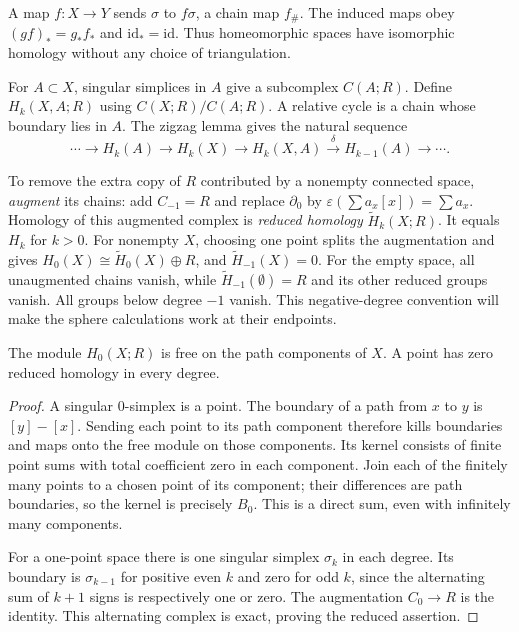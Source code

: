 A map $f:X\to Y$ sends $\sigma$ to $f\sigma$, a chain map $f_\#$. The induced maps obey $(gf)_*=g_*f_*$ and $\mathrm{id}_*=\mathrm{id}$. Thus homeomorphic spaces have isomorphic homology without any choice of triangulation.

For $A\subset X$, singular simplices in $A$ give a subcomplex $C(A;R)$. Define $H_k(X,A;R)$ using $C(X;R)/C(A;R)$. A relative cycle is a chain whose boundary lies in $A$. The zigzag lemma gives the natural sequence
\[
\cdots\to H_k(A)\to H_k(X)\to H_k(X,A)\xrightarrow{\delta}H_{k-1}(A)\to\cdots.
\]

To remove the extra copy of $R$ contributed by a nonempty connected space, \emph{augment} its chains: add $C_{-1}=R$ and replace $\partial_0$ by $\varepsilon(\sum a_x[x])=\sum a_x$. Homology of this augmented complex is \emph{reduced homology} $\tilde H_k(X;R)$. It equals $H_k$ for $k>0$. For nonempty $X$, choosing one point splits the augmentation and gives $H_0(X)\cong\tilde H_0(X)\oplus R$, and $\tilde H_{-1}(X)=0$. For the empty space, all unaugmented chains vanish, while $\tilde H_{-1}(\emptyset)=R$ and its other reduced groups vanish. All groups below degree $-1$ vanish. This negative-degree convention will make the sphere calculations work at their endpoints.

\begin{proposition}\label{prop:H0}
The module $H_0(X;R)$ is free on the path components of $X$. A point has zero reduced homology in every degree.
\end{proposition}

\begin{proof}
A singular $0$-simplex is a point. The boundary of a path from $x$ to $y$ is $[y]-[x]$. Sending each point to its path component therefore kills boundaries and maps onto the free module on those components. Its kernel consists of finite point sums with total coefficient zero in each component. Join each of the finitely many points to a chosen point of its component; their differences are path boundaries, so the kernel is precisely $B_0$. This is a direct sum, even with infinitely many components.

For a one-point space there is one singular simplex $\sigma_k$ in each degree. Its boundary is $\sigma_{k-1}$ for positive even $k$ and zero for odd $k$, since the alternating sum of $k+1$ signs is respectively one or zero. The augmentation $C_0\to R$ is the identity. This alternating complex is exact, proving the reduced assertion.
\end{proof}

